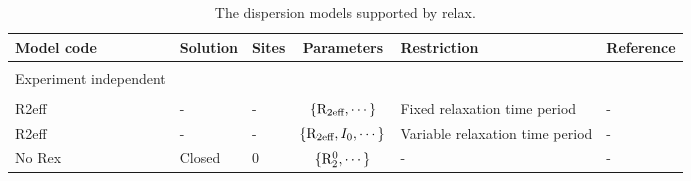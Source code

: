\begin{sidewaystable}
\begin{center}
\begin{small}

\caption[The dispersion models.]{The dispersion models supported by relax.}

\begin{tabular}{lllcll}

\\[-5pt]
\toprule

Model code               & Solution & Sites & Parameters                                          & Restriction                       & Reference \\

\midrule

\\[-5pt]
Experiment independent \\
\cline{1-1}
\\[-5pt]
R2eff                    & -        & -     & $\{\mathrm{R}_\textrm{2eff}, \cdots\}$                              & Fixed relaxation time period      & - \\
R2eff                    & -        & -     & $\{\mathrm{R}_\textrm{2eff}, I_0, \cdots\}$                         & Variable relaxation time period   & - \\
No Rex                   & Closed   & 0     & $\{\mathrm{R}_2^0, \cdots\}$                             & -                                 & - \\


\end{tabular}
\end{small}
\end{center}
\end{sidewaystable}
